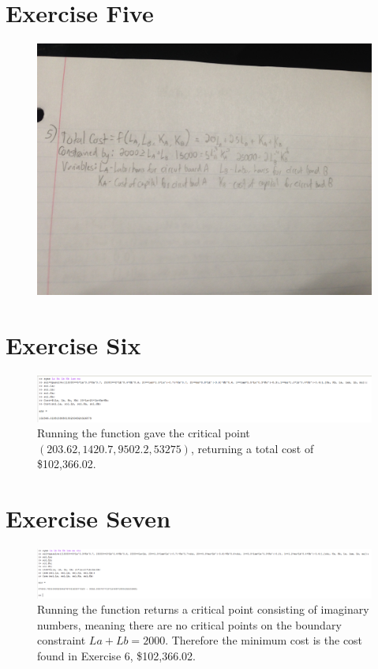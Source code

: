 \documentclass[11pt]{article}
\begin{document}
\section*{Exercise Five}
\begin{figure}[H]
	\centering
	\includegraphics[width=\textwidth]{Five.JPG}
\end{figure}

\section*{Exercise Six}
\begin{figure}[H]
	\centering
	\includegraphics[width=\textwidth]{Six.PNG}
	\caption*{Running the function gave the critical point $(203.62, 1420.7, 9502.2, 53275)$, returning a total cost of \$102,366.02.}
\end{figure}

\section*{Exercise Seven}
\begin{figure}[H]
	\centering
	\includegraphics[width=\textwidth]{Seven.PNG}
	\caption*{Running the function returns a critical point consisting of imaginary numbers, meaning there are no critical points on the boundary constraint $La+Lb=2000$. Therefore the minimum cost is the cost found in Exercise 6, \$102,366.02.}
\end{figure}
\end{document}
